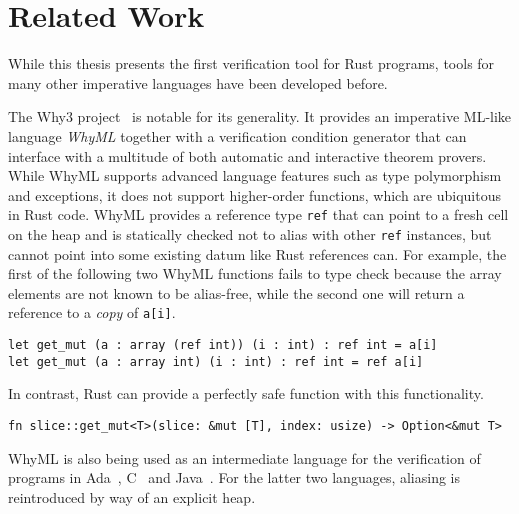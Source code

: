 \section{Related Work}

While this thesis presents the first verification tool for Rust programs, tools
for many other imperative languages have been developed before.

The Why3 project~\cite{bobot2011why3} is notable for its generality. It provides
an imperative ML-like language \emph{WhyML} together with a verification
condition generator that can interface with a multitude of both automatic and
interactive theorem provers. While WhyML supports advanced language features such
as type polymorphism and exceptions, it does not support higher-order functions,
which are ubiquitous in Rust code.
WhyML provides a reference type \texttt{ref} that can point to a fresh cell on
the heap and is statically checked not to alias with other \texttt{ref}
instances, but cannot point into some existing datum like Rust references can.
For example, the first of the following two WhyML functions fails to type check
because the array elements are not known to be alias-free, while the second one
will return a reference to a \emph{copy} of \verb!a[i]!.

\begin{verbatim}
let get_mut (a : array (ref int)) (i : int) : ref int = a[i]
let get_mut (a : array int) (i : int) : ref int = ref a[i]
\end{verbatim}

In contrast, Rust can provide a perfectly safe function with this functionality.

\begin{verbatim}
fn slice::get_mut<T>(slice: &mut [T], index: usize) -> Option<&mut T>
\end{verbatim}

WhyML is also being used as an intermediate language for the verification of
programs in Ada~\cite{guitton2011hi}, C~\cite{cuoq2012frama} and Java~\cite{filliatre2007krakatoa}.
For the latter two languages, aliasing is reintroduced by way of an explicit heap.


